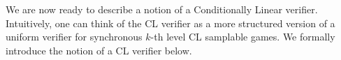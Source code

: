 We are now ready to describe a notion of a Conditionally Linear verifier. Intuitively, one can think of the CL verifier as a more structured version of a uniform verifier for synchronous $k$-th level CL samplable games. We formally introduce the notion of a CL verifier below.

